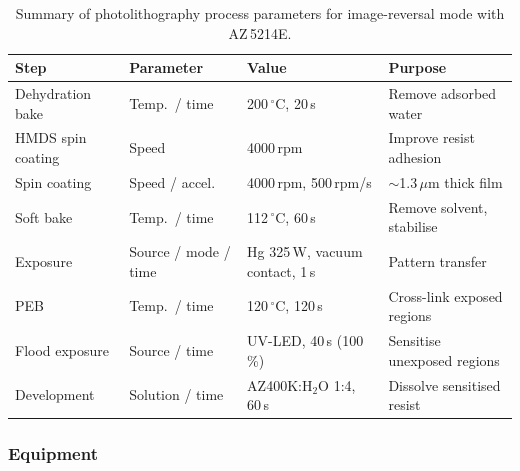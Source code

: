 \begin{table}[H]
  \centering
  \small
  \begin{tabularx}{\textwidth}{lXXX}
    \toprule
    \textbf{Step} & \textbf{Parameter} & \textbf{Value} & \textbf{Purpose} \\
    \midrule
    Dehydration bake  & Temp.\ / time        & 200\,$^\circ$C, 20\,s
    & Remove adsorbed water \\
    HMDS spin coating & Speed                & 4000\,rpm
    & Improve resist adhesion \\
    Spin coating      & Speed / accel.       & 4000\,rpm, 500\,rpm/s
    & $\sim$1.3\,$\mu$m thick film \\
    Soft bake         & Temp.\ / time        & 112\,$^\circ$C, 60\,s
    & Remove solvent, stabilise \\
    Exposure          & Source / mode / time & Hg 325\,W, vacuum
    contact, 1\,s & Pattern transfer \\
    PEB               & Temp.\ / time        & 120\,$^\circ$C, 120\,s
    & Cross-link exposed regions \\
    Flood exposure    & Source / time        & UV-LED, 40\,s
    (100\,\%)        & Sensitise unexposed regions \\
    Development       & Solution / time      & AZ400K:H$_2$O 1:4,
    60\,s      & Dissolve sensitised resist \\
    \bottomrule
  \end{tabularx}
  \caption{Summary of photolithography process parameters for
    image-reversal mode
  with AZ\,5214E.}
  \label{tab:micro_process}
\end{table}

\subsubsection{Equipment}

